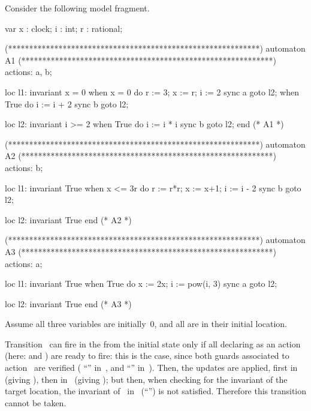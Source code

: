 \begin{example}\label{example:sync-model-updates}
Consider the following \imitator{} model fragment.

\begin{IMITATORmodel}
var
	x : clock;
	i : int;
	r : rational;

(************************************************************)
  automaton A1
(************************************************************)
actions: a, b;

loc l1: invariant x = 0
	when x = 0 do {r := 3; x := r; i := 2} sync a goto l2;
	when True do {i := i + 2} sync b goto l2;

loc l2: invariant i >= 2
	when True do {i := i * i} sync b goto l2;
end (* A1 *)

(************************************************************)
  automaton A2
(************************************************************)
actions: b;

loc l1: invariant True
	when x <= 3r do {r := r*r; x := x+1; i := i - 2} sync b goto l2;

loc l2: invariant True
end (* A2 *)


(************************************************************)
  automaton A3
(************************************************************)
actions: a;

loc l1: invariant True
	when True do {x := 2x; i := pow(i, 3)} sync a goto l2;

loc l2: invariant True
end (* A3 *)
\end{IMITATORmodel}

Assume all three variables are initially~0, and all \IPTA{} are in their initial  location.

Transition~ can fire in the \NIPTA{} from the initial state only if all \IPTA{} declaring  as an action (here:  and ) are ready to fire: this is the case, since both guards associated to action~ are verified (\ie{} ``'' in~, and ``'' in~).
Then, the updates are applied, first in~ (giving ), then in~ (giving );
but then, when checking for the invariant of the target location, the invariant of~ in~ (``'') is not satisfied.
Therefore this transition cannot be taken.


\end{example}
